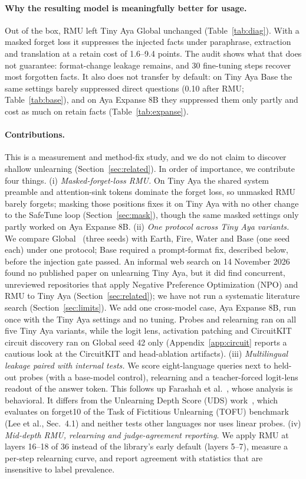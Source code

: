 \documentclass[10pt,twocolumn]{article}
\begin{document}
\paragraph{Why the resulting model is meaningfully better for usage.} Out of the box, RMU left Tiny Aya Global unchanged (Table~\ref{tab:diag}). With a masked forget loss it suppresses the injected facts under paraphrase, extraction and translation at a retain cost of 1.6--9.4 points. The audit shows what that does not guarantee: format-change leakage remains, and 30 fine-tuning steps recover most forgotten facts. It also does not transfer by default: on Tiny Aya Base the same settings barely suppressed direct questions (0.10 after RMU; Table~\ref{tab:base}), and on Aya Expanse 8B they suppressed them only partly and cost as much on retain facts (Table~\ref{tab:expanse}).

\paragraph{Contributions.} This is a measurement and method-fix study, and we do not claim to discover shallow unlearning (Section~\ref{sec:related}). In order of importance, we contribute four things.
(i) \emph{Masked-forget-loss RMU.} On Tiny Aya the shared system preamble and attention-sink tokens dominate the forget loss, so unmasked RMU barely forgets; masking those positions fixes it on Tiny Aya with no other change to the SafeTune loop (Section~\ref{sec:mask}), though the same masked settings only partly worked on Aya Expanse 8B.
(ii) \emph{One protocol across Tiny Aya variants.} We compare Global~\cite{salamanca2026tinyaya} (three seeds) with Earth, Fire, Water and Base (one seed each) under one protocol; Base required a prompt-format fix, described below, before the injection gate passed. An informal web search on 14 November 2026 found no published paper on unlearning Tiny Aya, but it did find concurrent, unreviewed repositories that apply Negative Preference Optimization (NPO) and RMU to Tiny Aya (Section~\ref{sec:related}); we have not run a systematic literature search (Section~\ref{sec:limits}). We add one cross-model case, Aya Expanse 8B, run once with the Tiny Aya settings and no tuning. Probes and relearning ran on all five Tiny Aya variants, while the logit lens, activation patching and CircuitKIT circuit discovery ran on Global seed 42 only (Appendix~\ref{app:circuit} reports a cautious look at the CircuitKIT and head-ablation artifacts).
(iii) \emph{Multilingual leakage paired with internal tests.} We score eight-language queries next to held-out probes (with a base-model control), relearning and a teacher-forced logit-lens readout of the answer token. This follows up Farashah et al.~\cite{farashah2026amnesia}, whose analysis is behavioral. It differs from the Unlearning Depth Score (UDS) work~\cite{lee2026uds}, which evaluates on forget10 of the Task of Fictitious Unlearning (TOFU) benchmark (Lee et al., Sec.~4.1) and neither tests other languages nor uses linear probes.
(iv) \emph{Mid-depth RMU, relearning and judge-agreement reporting.} We apply RMU at layers 16--18 of 36 instead of the library's early default (layers 5--7), measure a per-step relearning curve, and report agreement with statistics that are insensitive to label prevalence.
\end{document}

